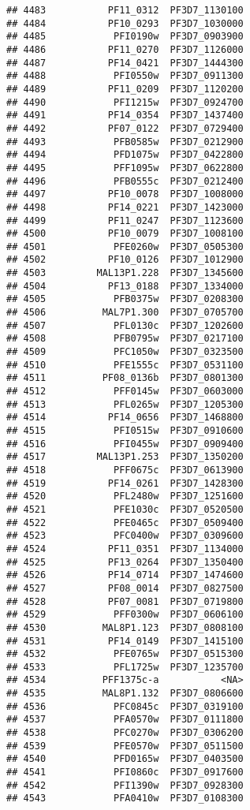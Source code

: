 \documentclass[12pt, a4paper]{article}\usepackage[]{graphicx}\usepackage[]{color}
\makeatletter
\newenvironment{kframe}{%
 \def\at@end@of@kframe{}%
 \ifinner\ifhmode%
  \def\at@end@of@kframe{\end{minipage}}%
  \begin{minipage}{\columnwidth}%
 \fi\fi%
 \def\FrameCommand##1{\hskip\@totalleftmargin \hskip-\fboxsep
 \colorbox{shadecolor}{##1}\hskip-\fboxsep
     \hskip-\linewidth \hskip-\@totalleftmargin \hskip\columnwidth}%
 \MakeFramed {\advance\hsize-\width
   \@totalleftmargin\z@ \linewidth\hsize
   \@setminipage}}%
 {\par\unskip\endMakeFramed%
 \at@end@of@kframe}
\newenvironment{knitrout}{}{} %
\makeatother
\begin{document}
\begin{knitrout}
\begin{kframe}
\begin{verbatim}
## 4483           PF11_0312  PF3D7_1130100
## 4484           PF10_0293  PF3D7_1030000
## 4485            PFI0190w  PF3D7_0903900
## 4486           PF11_0270  PF3D7_1126000
## 4487           PF14_0421  PF3D7_1444300
## 4488            PFI0550w  PF3D7_0911300
## 4489           PF11_0209  PF3D7_1120200
## 4490            PFI1215w  PF3D7_0924700
## 4491           PF14_0354  PF3D7_1437400
## 4492           PF07_0122  PF3D7_0729400
## 4493            PFB0585w  PF3D7_0212900
## 4494            PFD1075w  PF3D7_0422800
## 4495            PFF1095w  PF3D7_0622800
## 4496            PFB0555c  PF3D7_0212400
## 4497           PF10_0078  PF3D7_1008000
## 4498           PF14_0221  PF3D7_1423000
## 4499           PF11_0247  PF3D7_1123600
## 4500           PF10_0079  PF3D7_1008100
## 4501            PFE0260w  PF3D7_0505300
## 4502           PF10_0126  PF3D7_1012900
## 4503         MAL13P1.228  PF3D7_1345600
## 4504           PF13_0188  PF3D7_1334000
## 4505            PFB0375w  PF3D7_0208300
## 4506          MAL7P1.300  PF3D7_0705700
## 4507            PFL0130c  PF3D7_1202600
## 4508            PFB0795w  PF3D7_0217100
## 4509            PFC1050w  PF3D7_0323500
## 4510            PFE1555c  PF3D7_0531100
## 4511          PF08_0136b  PF3D7_0801300
## 4512            PFF0145w  PF3D7_0603000
## 4513            PFL0265w  PF3D7_1205300
## 4514           PF14_0656  PF3D7_1468800
## 4515            PFI0515w  PF3D7_0910600
## 4516            PFI0455w  PF3D7_0909400
## 4517         MAL13P1.253  PF3D7_1350200
## 4518            PFF0675c  PF3D7_0613900
## 4519           PF14_0261  PF3D7_1428300
## 4520            PFL2480w  PF3D7_1251600
## 4521            PFE1030c  PF3D7_0520500
## 4522            PFE0465c  PF3D7_0509400
## 4523            PFC0400w  PF3D7_0309600
## 4524           PF11_0351  PF3D7_1134000
## 4525           PF13_0264  PF3D7_1350400
## 4526           PF14_0714  PF3D7_1474600
## 4527           PF08_0014  PF3D7_0827500
## 4528           PF07_0081  PF3D7_0719800
## 4529            PFF0300w  PF3D7_0606100
## 4530          MAL8P1.123  PF3D7_0808100
## 4531           PF14_0149  PF3D7_1415100
## 4532            PFE0765w  PF3D7_0515300
## 4533            PFL1725w  PF3D7_1235700
## 4534          PFF1375c-a           <NA>
## 4535          MAL8P1.132  PF3D7_0806600
## 4536            PFC0845c  PF3D7_0319100
## 4537            PFA0570w  PF3D7_0111800
## 4538            PFC0270w  PF3D7_0306200
## 4539            PFE0570w  PF3D7_0511500
## 4540            PFD0165w  PF3D7_0403500
## 4541            PFI0860c  PF3D7_0917600
## 4542            PFI1390w  PF3D7_0928300
## 4543            PFA0410w  PF3D7_0108300

\end{verbatim}
\end{kframe}
\end{knitrout}
\end{document}
